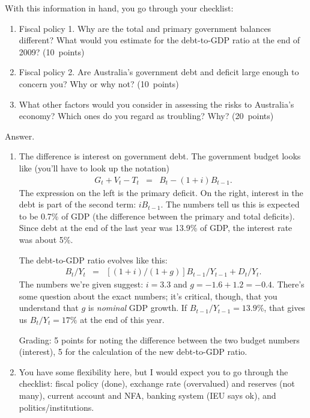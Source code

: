 \documentclass[letterpaper,12pt]{exam}
\begin{document}
\begin{enumerate}
With this information in hand, you go through your checklist:  
%
\begin{enumerate}
\item Fiscal policy 1.  
Why are the total and primary government balances different?  
What would you estimate for the debt-to-GDP ratio 
at the end of 2009?  
(10~points) 

\item Fiscal policy 2.  
Are Australia's government debt and deficit large enough to 
concern you?
Why or why not? 
(10~points) 

\item What other factors would you consider in 
assessing the risks to Australia's economy?  
Which ones do you regard as troubling?  
Why?  
(20~points)

\end{enumerate}

Answer.
\begin{enumerate}
\item The difference is interest on government debt.  
The government budget looks like (you'll have to look 
up the notation)
\begin{eqnarray*}
    G_t + V_t - T_t &=& B_t - (1+i)B_{t-1} .
\end{eqnarray*}
The expression on the left is the primary deficit.
On the right, interest in the debt is part of the second
term:  $ i B_{t-1}$.  
The numbers tell us this is expected to be 0.7\% of GDP
(the difference between the primary and total deficits).  
Since debt at the end of the last year was 13.9\% of GDP,
the interest rate was about 5\%.  

The debt-to-GDP ratio evolves like this:  
\begin{eqnarray*}
    B_t/Y_t  &=&  [(1+i)/(1+g)] B_{t-1}/Y_{t-1} + D_t/Y_t .
\end{eqnarray*}
The numbers we're given suggest:  $i = 3.3$
and $ g = -1.6 + 1.2 = -0.4 $.
There's some question about the exact numbers;
it's critical, though, that you understand that $g$ 
is {\it nominal\/} GDP growth.  If $B_{t-1}/Y_{t-1} = 13.9\%$, 
that gives us $B_t/Y_t = 17\% $ at the end of this year.  

Grading:  5 points for noting the difference between the two
budget numbers (interest), 5 for the calculation of 
the new debt-to-GDP ratio.  

\item You have some flexibility here, but I would expect you to 
go through the checklist:  
fiscal policy (done), 
exchange rate (overvalued) and reserves (not many), 
current account and NFA, 
banking system (IEU says ok), and politics/institutions.  


\end{enumerate}
\end{enumerate}
\end{document}
